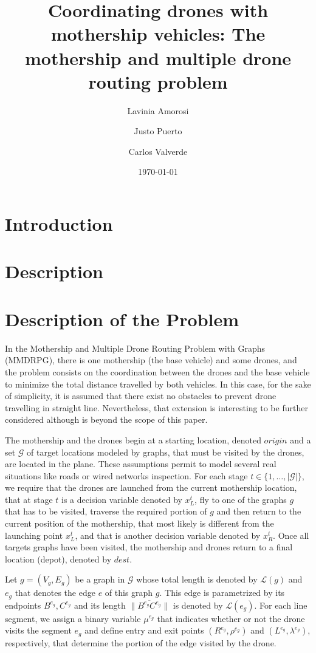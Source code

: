 \documentclass[10pt,a4paper]{article}
\title{Coordinating drones with mothership vehicles: The mothership and multiple drone routing problem}
\author{Lavinia Amorosi \and Justo Puerto \and Carlos Valverde}
\date{\today}
\newcommand{\LA}[1]{{\color{blue}#1}}
\begin{document}
\section{Introduction}

\section{Description}
\section{Description of the Problem}
In the Mothership and Multiple Drone Routing Problem with Graphs (MMDRPG), there is one mothership (the base vehicle) and some drones, and the problem consists on the coordination between the drones and the base vehicle to minimize the total distance travelled by both vehicles. In this case, for the sake of simplicity, \LA{it is assumed} that there exist no obstacles to prevent drone travelling in straight line. Nevertheless, that extension is interesting to be further considered although is beyond the scope of this paper.

The mothership and the drones begin at a starting location, denoted $origin$ \LA{and a set $\mathcal G$ of target locations modeled by graphs, that must be visited by the drones, are located in the plane. These assumptions permit to model several real situations like roads or wired networks inspection.}
For each stage $t \in \{1, \ldots, |\mathcal G|\}$, we require that the drones are launched from the current mothership location, that at stage $t$ is a decision variable denoted by $x_L^t$, fly to one of the graphs $g$ that has to be visited, traverse the required portion of $g$ and then return to the current position of the mothership, that most likely is different from the launching point $x_L^t$, and that is another decision variable denoted by $x_R^t$. Once all targets graphs have been visited, the mothership and drones return to a final location (depot), denoted by $dest$.

Let $g = (V_g, E_g)$ be a graph in $\mathcal G$ whose total length is denoted by $\mathcal L(g)$ and $e_g$ that denotes the edge $e$ of this graph $g$. This edge is parametrized by its endpoints $B^{e_g}, C^{e_g}$ and its length $\|\overline{B^{e_g}C^{e_g}}\|$ is denoted by $\mathcal L(e_g)$. For each line segment, we assign a binary variable $\mu^{e_g}$ that indicates whether or not the drone visits the segment $e_g$ and define entry and exit points $(R^{e_g}, \rho^{e_g})$ and $(L^{e_g}, \lambda^{e_g})$, respectively, that determine the portion of the edge visited by the drone.
\end{document}
